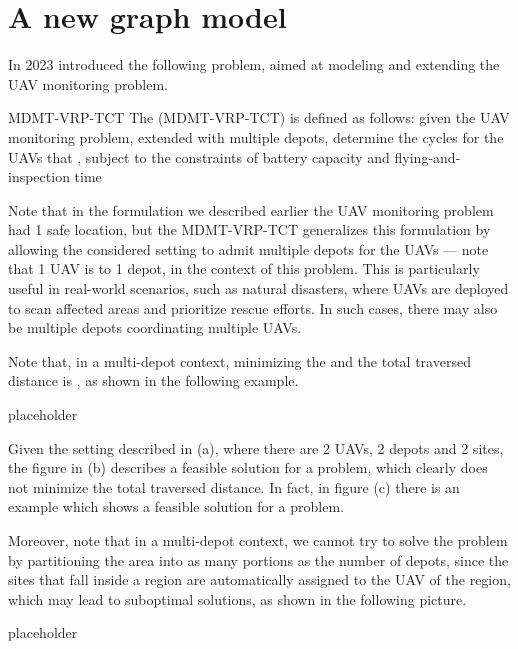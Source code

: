 \documentclass[a4paper, 12pt]{report}
\begin{document}
    \section{A new graph model}

    In 2023 \textcite{calamoneri} introduced the following problem, aimed at modeling and extending the UAV monitoring problem.

    \begin{frameddefn}{MDMT-VRP-TCT}
        The  (MDMT-VRP-TCT) is defined as follows: given the UAV monitoring problem, extended with multiple depots, determine the cycles for the UAVs that , subject to the constraints of battery capacity and flying-and-inspection time
    \end{frameddefn}
    
    Note that in the formulation we described earlier the UAV monitoring problem had 1 safe location, but the MDMT-VRP-TCT generalizes this formulation by allowing the considered setting to admit multiple depots for the UAVs --- note that 1 UAV is  to 1 depot, in the context of this problem. This is particularly useful in real-world scenarios, such as natural disasters, where UAVs are deployed to scan affected areas and prioritize rescue efforts. In such cases, there may also be multiple depots coordinating multiple UAVs.

    Note that, in a multi-depot context, minimizing the  and the total traversed distance is , as shown in the following example.

    placeholder 

    Given the setting described in (a), where there are 2 UAVs, 2 depots and 2 sites, the figure in (b) describes a feasible solution for a  problem, which clearly does not minimize the total traversed distance. In fact, in figure (c) there is an example which shows a feasible solution for a  problem.

    Moreover, note that in a multi-depot context, we cannot try to solve the problem by partitioning the area into as many portions as the number of depots, since the sites that fall inside a region are automatically assigned to the UAV of the region, which may lead to suboptimal solutions, as shown in the following picture.

    placeholder 
\end{document}
